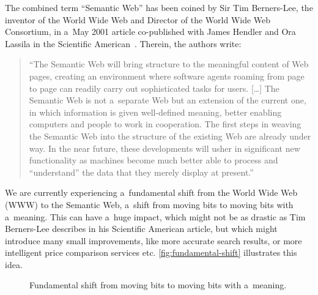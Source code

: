The combined term ``Semantic Web'' has been coined by Sir Tim Berners-Lee,
the inventor of the World Wide Web and Director of the World Wide Web Consortium,
in a~May 2001 article co-published with James Hendler and Ora Lassila
in the Scientific American~\cite{BernersLee2001}.
Therein, the authors write: 

\begin{quotation}
``The Semantic Web will bring structure to the meaningful content of Web pages,
creating an environment where software agents roaming from page to page
can readily carry out sophisticated tasks for users. [\ldots]
The Semantic Web is not a~separate Web but an extension of the current one,
in which information is given well-defined meaning, better enabling computers and people
to work in cooperation.
The first steps in weaving the Semantic Web into the structure of the existing Web
are already under way.
In the near future, these developments will usher in significant new functionality
as machines become much better able to process and ``understand'' the data
that they merely display at present.''
\end{quotation}

We are currently experiencing a~fundamental shift from the World Wide Web (WWW) to the Semantic Web,
a~shift from moving bits to moving bits with a~meaning.
This can have a~huge impact, which might not be as drastic as Tim Berners-Lee describes
in his Scientific American article, but which might introduce many small improvements,
like more accurate search results, or more intelligent price comparison services etc.
\autoref{fig:fundamental-shift} illustrates this idea.

\begin{figure}[htbp!]
\begin{center}
  \caption{Fundamental shift from moving bits to moving bits with a~meaning.}
  \label{fig:fundamental-shift}  
\end{center}    
\end{figure}

